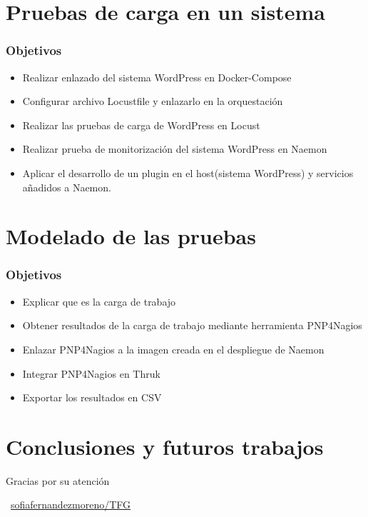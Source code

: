 \documentclass{beamer}
\theoremstyle{plain}
\theoremstyle{definition}
\theoremstyle{plain}
\theoremstyle{definition}
\theoremstyle{remark}
\theoremstyle{definition}
\begin{document}
\section{Pruebas de carga en un sistema} %
\begin{frame}
	
	\frametitle{Objetivos}
	\begin{itemize}
		\item Realizar enlazado del sistema WordPress en Docker-Compose
		\item Configurar archivo Locustfile y enlazarlo en la orquestación
		\item Realizar las pruebas de carga de WordPress en Locust
		\item Realizar prueba de monitorización del sistema WordPress en Naemon
		\item Aplicar el desarrollo de un plugin en el host(sistema WordPress) y servicios añadidos a Naemon.		
	\end{itemize}
	
\end{frame}

\section{Modelado de las pruebas} %
\begin{frame}
	
	\frametitle{Objetivos}
	\begin{itemize}
		\item Explicar que es la carga de trabajo
		\item Obtener resultados de la carga de trabajo mediante herramienta PNP4Nagios
		\item Enlazar PNP4Nagios a la imagen creada en el despliegue de Naemon
		\item Integrar PNP4Nagios en Thruk
		\item Exportar los resultados en CSV			
	\end{itemize}
	
\end{frame}

\section{Conclusiones y futuros trabajos}

\begin{frame}{}{}
	\Huge{\centerline{Gracias por su atención}}
	\centerline{\Huge{\raisebox{-.25\height}\faGithub}~\large{\href{https://github.com/sofiafernandezmoreno/TFG}{\alert{sofiafernandezmoreno/TFG}}}}
	
	
	

\end{frame}
\end{document}
